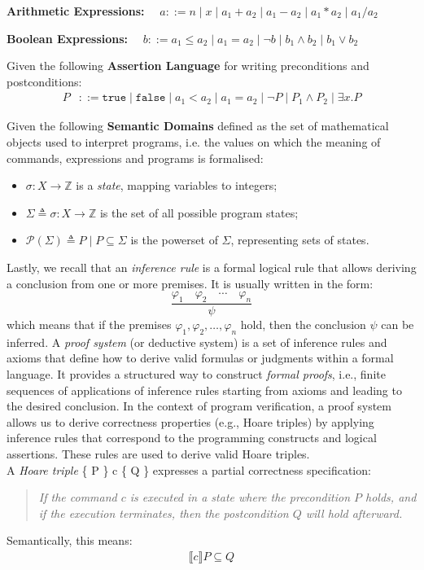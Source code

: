 \documentclass[parskip=half]{scrartcl}
\begin{document}
\textbf{Arithmetic Expressions:} $\quad a ::= n \mid x \mid a_1 + a_2 \mid a_1 - a_2 \mid a_1 * a_2 \mid a_1 / a_2$

\textbf{Boolean Expressions:} $\quad b ::= a_1 \leq a_2 \mid a_1 = a_2 \mid \neg b \mid b_1 \wedge b_2 \mid b_1 \vee b_2$


Given the following \textbf{Assertion Language} for writing preconditions and postconditions:
\begin{align*}
P &::= \texttt{true} \mid \texttt{false} \mid a_1 < a_2 \mid a_1 = a_2 \mid \neg P \mid P_1 \wedge P_2 \mid \exists x . P
\end{align*}

Given the following \textbf{Semantic Domains} defined as the set of mathematical objects used to interpret programs, i.e. the values on which the meaning of commands, expressions and programs is formalised: 
\begin{itemize}
\item $\sigma : X \rightarrow \mathbb{Z}$ is a \emph{state}, mapping variables to integers;
\item $\Sigma \triangleq {\sigma : X \rightarrow \mathbb{Z}}$ is the set of all possible program states;
\item $\mathcal{P}(\Sigma) \triangleq {P \mid P \subseteq \Sigma}$ is the powerset of $\Sigma$, representing sets of states.
\end{itemize}

Lastly, we recall that an \emph{inference rule} is a formal logical rule that allows deriving a conclusion from one or more premises. It is usually written in the form:
\[
\frac{\varphi_1 \quad \varphi_2 \quad \cdots \quad \varphi_n}{\psi}
\]
which means that if the premises $\varphi_1, \varphi_2, \ldots, \varphi_n$ hold, then the conclusion $\psi$ can be inferred.
A \emph{proof system} (or deductive system) is a set of inference rules and axioms that define how to derive valid formulas or judgments within a formal language. It provides a structured way to construct \emph{formal proofs}, i.e., finite sequences of applications of inference rules starting from axioms and leading to the desired conclusion.
In the context of program verification, a proof system allows us to derive correctness properties (e.g., Hoare triples) by applying inference rules that correspond to the programming constructs and logical assertions.
These rules are used to derive valid Hoare triples.
\\ A \emph{Hoare triple} \{ P \} c \{ Q \} expresses a partial correctness specification:
\begin{quote}
\emph{If the command $c$ is executed in a state where the precondition $P$ holds, and if the execution terminates, then the postcondition $Q$ will hold afterward.}
\end{quote}
Semantically, this means:
\begin{align*}
\llbracket c \rrbracket P \subseteq Q
\end{align*}
\end{document}
